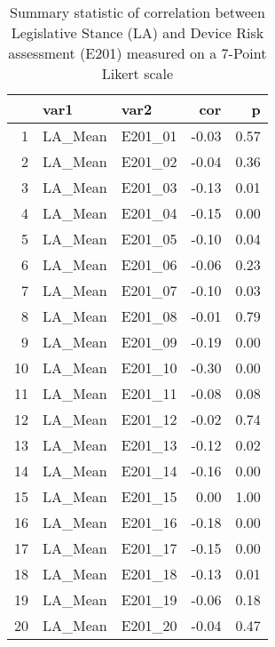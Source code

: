 \begin{table}[ht]
\centering
\begin{tabular}{rllrr}
  \hline
 & var1 & var2 & cor & p \\ 
  \hline
1 & LA\_Mean & E201\_01 & -0.03 & 0.57 \\ 
  2 & LA\_Mean & E201\_02 & -0.04 & 0.36 \\ 
  3 & LA\_Mean & E201\_03 & -0.13 & 0.01 \\ 
  4 & LA\_Mean & E201\_04 & -0.15 & 0.00 \\ 
  5 & LA\_Mean & E201\_05 & -0.10 & 0.04 \\ 
  6 & LA\_Mean & E201\_06 & -0.06 & 0.23 \\ 
  7 & LA\_Mean & E201\_07 & -0.10 & 0.03 \\ 
  8 & LA\_Mean & E201\_08 & -0.01 & 0.79 \\ 
  9 & LA\_Mean & E201\_09 & -0.19 & 0.00 \\ 
  10 & LA\_Mean & E201\_10 & -0.30 & 0.00 \\ 
  11 & LA\_Mean & E201\_11 & -0.08 & 0.08 \\ 
  12 & LA\_Mean & E201\_12 & -0.02 & 0.74 \\ 
  13 & LA\_Mean & E201\_13 & -0.12 & 0.02 \\ 
  14 & LA\_Mean & E201\_14 & -0.16 & 0.00 \\ 
  15 & LA\_Mean & E201\_15 & 0.00 & 1.00 \\ 
  16 & LA\_Mean & E201\_16 & -0.18 & 0.00 \\ 
  17 & LA\_Mean & E201\_17 & -0.15 & 0.00 \\ 
  18 & LA\_Mean & E201\_18 & -0.13 & 0.01 \\ 
  19 & LA\_Mean & E201\_19 & -0.06 & 0.18 \\ 
  20 & LA\_Mean & E201\_20 & -0.04 & 0.47 \\ 
   \hline
\end{tabular}
\caption{Summary statistic of correlation between Legislative Stance (LA) and Device Risk assessment (E201) measured on a 7-Point Likert scale} 
\label{RQ1_H3_DeviceRiskLA}
\end{table}
